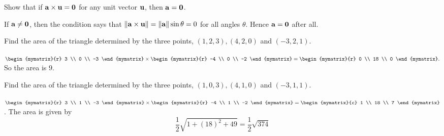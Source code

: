 \begin{enumialphparenastyle}

\begin{ex} Show that if ${\bf a}\times {\bf u}={\bf 0}$ for any unit vector ${\bf u}
$, then ${\bf a}={\bf 0}$.
\begin{sol}
If ${\bf a}\neq {\bf 0}$, then the condition says that $\| {\bf a}\times {\bf u}\| = \| {\bf a} \| \sin \theta =0$ for all angles $\theta $. Hence ${\bf a} = {\bf 0}$ after all.
\end{sol}
\end{ex}

\begin{ex} Find the area of the triangle determined by the three points, $\left(
1,2,3\right) ,\left( 4,2,0\right) $ and $\left( -3,2,1\right) .$
\begin{sol}
$\begin{mymatrix}{r}
3 \\
0 \\
-3
\end{mymatrix} \times \begin{mymatrix}{r}
 -4 \\
0 \\
-2
\end{mymatrix} =\begin{mymatrix}{r}
0 \\
18 \\
0
\end{mymatrix} .$ So the area is $9.$
\end{sol}
\end{ex}

\begin{ex} Find the area of the triangle determined by the three points, $\left(
1,0,3\right) ,\left( 4,1,0\right) $ and $\left( -3,1,1\right) .$
\begin{sol}
 $\begin{mymatrix}{r}
3 \\
1 \\
-3
\end{mymatrix} \times \begin{mymatrix}{r}
 -4 \\
1 \\
-2
\end{mymatrix} =\begin{mymatrix}{c}
1 \\
18 \\
7
\end{mymatrix}$. The area is given by 
\[
\frac{1}{2}\sqrt{1+\left( 18\right) ^{2}+49}=\frac{1}{2}\sqrt{374}
\]
\end{sol}
\end{ex}


\end{enumialphparenastyle}
